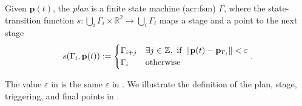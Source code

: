 \begin{highlight}  
  \begin{defn}[Plan]\label{def:plan}
    Given $\mathbf{p}(t)$, the \emph{plan} is a finite state machine (\Gls{acr:fsm}) $\Gamma$, where the state-transition function $s:\bigcup_i{\Gamma_i}\times\mathbb{R}^2\rightarrow\bigcup_i{\Gamma_i}$ maps a stage and a point to the next stage
    \begin{equation*}s(\Gamma_i,\mathbf{p}(t)):=\begin{cases}
      \Gamma_{i+j} & \exists j\in\mathbb{Z},\text{ if }\left\lVert\mathbf{p}(t)-\mathbf{p}_{\Gamma_i}\right\rVert<\varepsilon\\
      \Gamma_i & \text{otherwise}
    \end{cases}.\end{equation*}
  \end{defn}
\end{highlight}

The value $\varepsilon$ in  is the same $\varepsilon$ in . We illustrate the definition of the plan, stage, triggering, and final points in .

